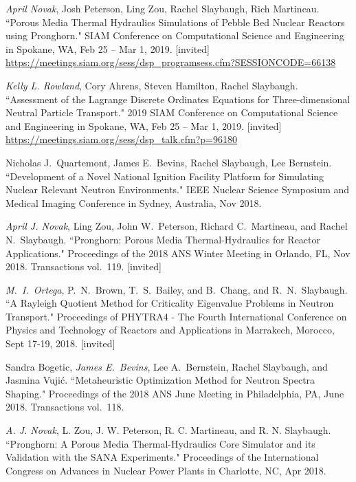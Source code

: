\begin{bibsection}
\item \textit{April Novak}, Josh Peterson, Ling Zou, Rachel Slaybaugh, Rich Martineau. ``Porous Media Thermal Hydraulics Simulations of Pebble Bed Nuclear Reactors using Pronghorn." SIAM Conference on Computational Science and Engineering in Spokane, WA, Feb 25 – Mar 1, 2019. [invited]\\
\url{https://meetings.siam.org/sess/dsp_programsess.cfm?SESSIONCODE=66138}

\item \textit{Kelly L. Rowland}, Cory Ahrens, Steven Hamilton, Rachel Slaybaugh. ``Assessment of the Lagrange Discrete Ordinates Equations for Three-dimensional Neutral Particle Transport." 2019 SIAM Conference on Computational Science and Engineering in Spokane, WA, Feb 25 – Mar 1, 2019. [invited]\\
\url{https://meetings.siam.org/sess/dsp_talk.cfm?p=96180}

\item Nicholas J.\ Quartemont, James E.\ Bevins, Rachel Slaybaugh, Lee Bernstein. ``Development of a Novel National Ignition Facility Platform for Simulating Nuclear Relevant Neutron Environments." IEEE Nuclear Science Symposium and Medical Imaging Conference in Sydney, Australia, Nov 2018. 

\item \textit{April J. Novak}, Ling Zou, John W.\ Peterson, Richard C.\ Martineau, and Rachel N.\ Slaybaugh. ``Pronghorn: Porous Media Thermal-Hydraulics for Reactor Applications." Proceedings of the 2018 ANS Winter Meeting in Orlando, FL, Nov 2018. Transactions vol.\ 119. [invited]

\item \textit{M.\ I.\ Ortega}, P.\ N.\ Brown, T.\ S.\ Bailey, and B.\ Chang, and R.\ N.\ Slaybaugh. ``A Rayleigh Quotient Method for Criticality Eigenvalue Problems in Neutron Transport." Proceedings of PHYTRA4 - The Fourth International Conference on Physics and Technology of Reactors and Applications in Marrakech, Morocco, Sept 17-19, 2018. [invited]

\item Sandra Bogetic, \textit{James E.\ Bevins}, Lee A.\ Bernstein, Rachel Slaybaugh, and Jasmina Vuji\'c. ``Metaheuristic Optimization Method for Neutron Spectra Shaping." Proceedings of the 2018 ANS June Meeting in Philadelphia, PA, June 2018. Transactions vol.\ 118. 

\item \textit{A. J. Novak}, L. Zou, J. W. Peterson, R. C. Martineau, and R. N. Slaybaugh.
``Pronghorn: A Porous Media Thermal-Hydraulics Core Simulator and its Validation with the SANA Experiments." Proceedings of the International Congress on Advances in Nuclear Power Plants in Charlotte, NC, Apr 2018. 


\end{bibsection}
